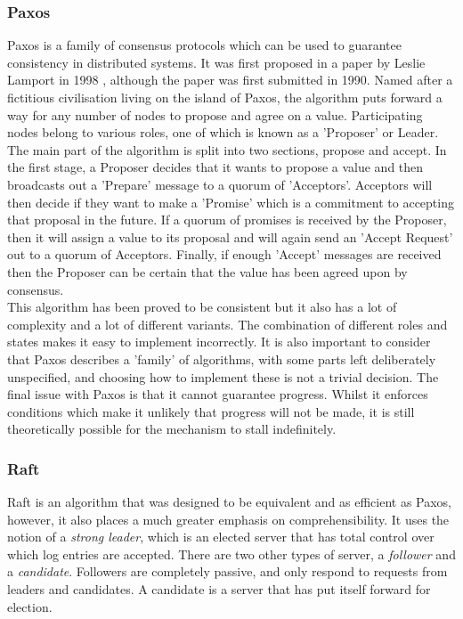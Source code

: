 \documentclass[12pt,a4paper,twoside,openright]{report}
\begin{document}
			\subsubsection*{Paxos}
			Paxos is a family of consensus protocols which can be used to guarantee consistency in distributed systems. 
			It was first proposed in a paper by Leslie Lamport in 1998 \cite{Paxos}, although the paper was first submitted in 1990.
			Named after a fictitious civilisation living on the island of Paxos, the algorithm puts forward a way for any number of nodes to propose and agree on a value.
			Participating nodes belong to various roles, one of which is known as a 'Proposer' or Leader.\\

			The main part of the algorithm is split into two sections, propose and accept.
			In the first stage, a Proposer decides that it wants to propose a value and then broadcasts out a 'Prepare' message to a quorum of 'Acceptors'.
			Acceptors will then decide if they want to make a 'Promise' which is a commitment to accepting that proposal in the future. 
			If a quorum of promises is received by the Proposer, then it will assign a value to its proposal and will again send an 'Accept Request' out to a quorum of Acceptors.
			Finally, if enough 'Accept' messages are received then the Proposer can be certain that the value has been agreed upon by consensus.\\

			This algorithm has been proved to be consistent but it also has a lot of complexity and a lot of different variants. 
			The combination of different roles and states makes it easy to implement incorrectly.
			It is also important to consider that Paxos describes a 'family' of algorithms, with some parts left deliberately unspecified, and choosing how to implement these is not a trivial decision.
			The final issue with Paxos is that it cannot guarantee progress.
			Whilst it enforces conditions which make it unlikely that progress will not be made, it is still theoretically possible for the mechanism to stall indefinitely.

			\subsubsection*{Raft}
			Raft is an algorithm that was designed to be equivalent and as efficient as Paxos, however, it also places a much greater emphasis on comprehensibility.
			It uses the notion of a \textit{strong leader}, which is an elected server that has total control over which log entries are accepted.
			There are two other types of server, a \textit{follower} and a \textit{candidate}. 
			Followers are completely passive, and only respond to requests from leaders and candidates. 
			A candidate is a server that has put itself forward for election.\\
\end{document}

